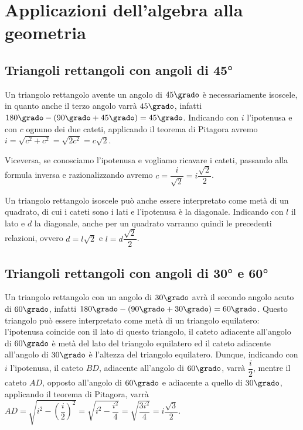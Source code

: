 \section{Applicazioni dell'algebra alla geometria}
\label{sect:applicazioni_algebra}

\subsection{Triangoli rettangoli con angoli di 45°}

\begin{wrapfigure}{r}{0.20\textwidth}
  \centering
\end{wrapfigure}
Un triangolo rettangolo avente un angolo di $45\grado$ è 
necessariamente isoscele, in quanto anche il terzo angolo varrà 
$45\grado$, infatti $180\grado - (90\grado+45\grado)=45\grado$.
Indicando con $i$ l'ipotenusa e con $c$ ognuno dei due cateti, 
applicando il teorema di Pitagora avremo 
$i=\sqrt{c^2+c^2}=\sqrt{2c^2}=c\sqrt{2}$.

Viceversa, se conosciamo l'ipotenusa e vogliamo ricavare i cateti, 
passando alla formula inversa e razionalizzando avremo 
$c=\dfrac{i}{\sqrt{2}}=i\dfrac{\sqrt{2}}{2}$.

Un triangolo rettangolo isoscele può anche essere interpretato come 
metà di un quadrato, di cui i cateti sono i lati e l'ipotenusa è la 
diagonale.
Indicando con $l$ il lato e $d$ la diagonale, anche per un quadrato 
varranno quindi le precedenti relazioni, ovvero $d=l\sqrt{2}$ e 
$l=d\dfrac{\sqrt{2}}{2}$.


\subsection{Triangoli rettangoli con angoli di 30° e 60°}

\begin{wrapfigure}{r}{0.25\textwidth}
  \centering
\end{wrapfigure}
Un triangolo rettangolo con un angolo di $30\grado$ avrà il secondo 
angolo acuto di $60\grado$, infatti $180\grado- 
(90\grado+30\grado)=60\grado$. Questo triangolo può essere 
interpretato come metà di un triangolo equilatero: l'ipotenusa 
coincide con il lato di questo triangolo, il cateto adiacente 
all'angolo di $60\grado$ è metà del lato del triangolo equilatero ed 
il cateto adiacente all'angolo di $30\grado$ è l'altezza del 
triangolo equilatero.
Dunque, indicando con $i$ l'ipotenusa, il cateto $BD$, adiacente 
all'angolo di $60\grado$, varrà $\dfrac{i}{2}$, mentre il cateto 
$AD$, opposto all'angolo di $60\grado$ e adiacente a quello di 
$30\grado$, applicando il teorema di Pitagora, varrà 
$AD=\sqrt{i^2-\left(\dfrac{i}{2}\right)^2}=\sqrt{i^2-\dfrac{i^2}{4}}
=\sqrt{\dfrac{3i^2}{4}}=i\dfrac{\sqrt{3}}{2}$.

